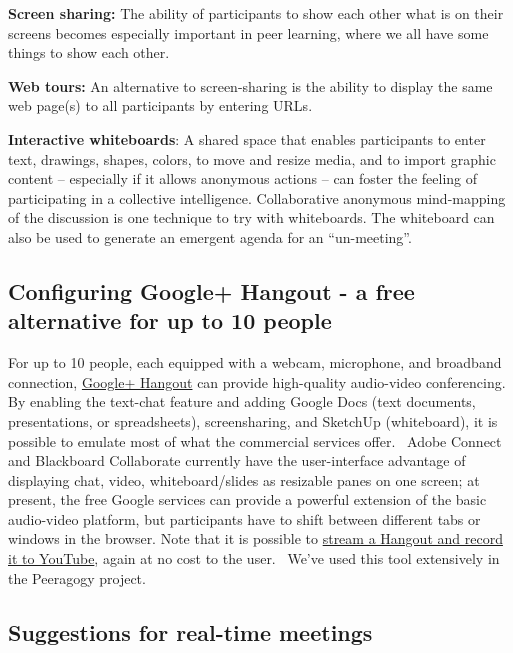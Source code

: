 \textbf{Screen sharing:} The ability of participants to show each other
what is on their screens becomes especially important in peer learning,
where we all have some things to show each other.

\textbf{Web tours:} An alternative to screen-sharing is the ability to
display the same web page(s) to all participants by entering URLs.

\textbf{Interactive whiteboards}: A shared space that enables
participants to enter text, drawings, shapes, colors, to move and resize
media, and to import graphic content -- especially if it allows
anonymous actions -- can foster the feeling of participating in a
collective intelligence. Collaborative anonymous mind-mapping of the
discussion is one technique to try with whiteboards. The whiteboard can
also be used to generate an emergent agenda for an ``un-meeting''.

\hypertarget{configuring-google-hangout---a-free-alternative-for-up-to-10-people}{%
\subsection{Configuring Google+ Hangout - a free alternative for up to
10
people}\label{configuring-google-hangout---a-free-alternative-for-up-to-10-people}}

For up to 10 people, each equipped with a webcam, microphone, and
broadband connection,
\href{http://lifehacker.com/5842191/google\%252B-hangouts-adds-screen-sharing-google-docs-collaboration-and-more}{Google+
Hangout} can provide high-quality audio-video conferencing. By enabling
the text-chat feature and adding Google Docs (text documents,
presentations, or spreadsheets), screensharing, and SketchUp
(whiteboard), it is possible to emulate most of what the commercial
services offer.~ Adobe Connect and Blackboard Collaborate currently have
the user-interface advantage of displaying chat, video,
whiteboard/slides as resizable panes on one screen; at present, the free
Google services can provide a powerful extension of the basic
audio-video platform, but participants have to shift between different
tabs or windows in the browser. Note that it is possible to
\href{http://www.google.com/+/learnmore/hangouts/onair.html}{stream a
Hangout and record it to YouTube}, again at no cost to the user.~ We've
used this tool extensively in the Peeragogy project.

\hypertarget{suggestions-for-real-time-meetings}{%
\subsection{Suggestions for real-time
meetings}\label{suggestions-for-real-time-meetings}}

